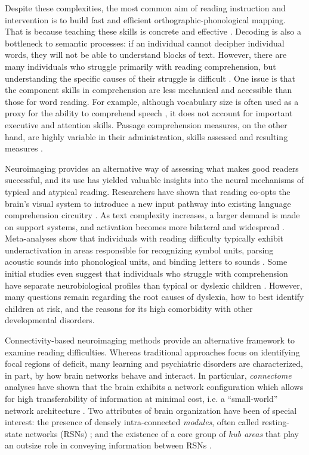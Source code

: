 Despite these complexities, the most common aim of reading instruction and intervention is to build fast and efficient orthographic-phonological mapping. That is because teaching these skills is concrete and effective \citep{NationalReadingPanel2000}. Decoding is also a bottleneck to semantic processes: if an individual cannot decipher individual words, they will not be able to understand blocks of text. However, there are many individuals who struggle primarily with reading comprehension, but understanding the specific causes of their struggle is difficult \citep{Cain2006}. One issue is that the component skills in comprehension are less mechanical and accessible than those for word reading. For example, although vocabulary size is often used as a proxy for the ability to comprehend speech \citep{Spencer2014}, it does not account for important executive and attention skills. Passage comprehension measures, on the other hand, are highly variable in their administration, skills assessed and resulting measures \citep{Cutting2009a}.

Neuroimaging provides an alternative way of assessing what makes good readers successful, and its use has yielded valuable insights into the neural mechanisms of typical and atypical reading. Researchers have shown that reading co-opts the brain's visual system to introduce a new input pathway into existing language comprehension circuitry \citep{Jobard2007}. As text complexity increases, a larger demand is made on support systems, and activation becomes more bilateral and widespread \citep{Xu2005}.  Meta-analyses show that individuals with reading difficulty typically exhibit underactivation in areas responsible for recognizing symbol units, parsing acoustic sounds into phonological units, and binding letters to sounds \citep{Maisog2008, Richlan2009, Paulesu2014}. Some initial studies even suggest that individuals who struggle with comprehension have separate neurobiological profiles than typical or dyslexic children \cite{Bailey2016}. However, many questions remain regarding the root causes of dyslexia, how to best identify children at risk, and the reasons for its high comorbidity with other developmental disorders. 

Connectivity-based neuroimaging methods provide an alternative framework to examine reading difficulties. Whereas traditional approaches focus on identifying focal regions of deficit, many learning and psychiatric disorders are characterized, in part, by how brain networks behave and interact. In particular, \textit{connectome} analyses have shown that the brain exhibits a network configuration which allows for high transferability of information at minimal cost, i.e. a ``small-world'' network architecture \citep{Bullmore2012}. Two attributes of brain organization have been of special interest: the presence of densely intra-connected \textit{modules}, often called resting-state networks (RSNs) \citep{Sporns2016}; and the existence of a core group of \textit{hub areas} that play an outsize role in conveying information between RSNs \citep{VandenHeuvel2011}. 

